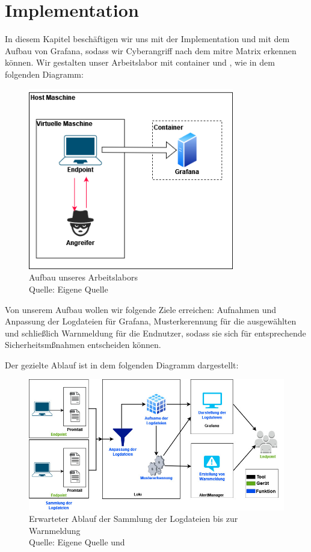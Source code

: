 \section{Implementation}
In diesem Kapitel beschäftigen wir uns mit der Implementation und mit dem Aufbau von Grafana, sodass wir \gls{Cyberangriff} nach dem \gls{mitre} Matrix erkennen können. Wir gestalten unser Arbeitslabor mit \gls{container} und , wie in dem folgenden Diagramm:

\begin{figure}[H]
   \centering
   \includegraphics[width=0.8\textwidth]{assets/Arbeitslabor.drawio.png}
   \caption{Aufbau unseres Arbeitslabors \\Quelle: Eigene Quelle}
   \centering
\end{figure}

Von unserem Aufbau wollen wir folgende Ziele erreichen: Aufnahmen und Anpassung der Logdateien für Grafana, Musterkerennung für die ausgewählten  und schließlich Warnmeldung für die Endnutzer, sodass sie sich für entsprechende Sicherheitsmßnahmen entscheiden können. 

\newpage
Der gezielte Ablauf ist in dem folgenden Diagramm dargestellt:

\begin{figure}[H]
   \centering
   \includegraphics[width=1\textwidth]{assets/Ablauf_grafana2.jpg}
   \caption{Erwarteter Ablauf der Sammlung der Logdateien bis zur Warnmeldung \\ Quelle: Eigene Quelle und \citep{Grafana_loki}}
   \centering
\end{figure}

